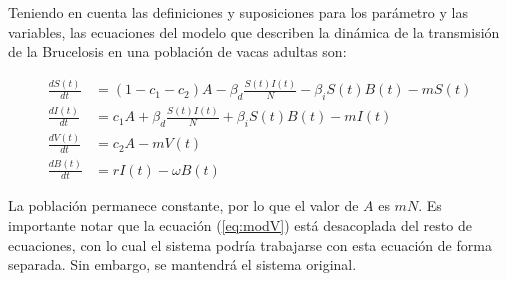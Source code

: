 \documentclass[12pt,preprint,times]{elsarticle}
\begin{document}
Teniendo en cuenta las definiciones y suposiciones para los parámetro y  las variables, las ecuaciones del modelo que describen la   dinámica de la transmisión de la  Brucelosis en una población de vacas adultas son: 

\begin{align}
\frac{dS(t)}{dt} & = (1-c_1-c_2)A -\beta_d\frac{ S(t)I(t)}{N}-\beta_i S(t)B(t)-mS(t) \label{eq:modS} \\ 
\frac{dI(t)}{dt} & = c_1A +\beta_d\frac{ S(t)I(t)}{N}+\beta_i S(t)B(t)-mI(t) \label{eq:modI} \\
\frac{dV(t)}{dt} & = c_2A -mV(t) \label{eq:modV}\\
\frac{dB(t)}{dt} & = rI(t)-\omega B(t) \label{eq:modB}
\end{align}


La población permanece constante, por lo que el valor de $A$ es $mN$. Es importante notar que la ecuación (\ref{eq:modV}) está desacoplada del resto de ecuaciones, con lo cual el sistema podría trabajarse con esta ecuación de forma separada. Sin embargo, se mantendrá el sistema original.
\end{document}
